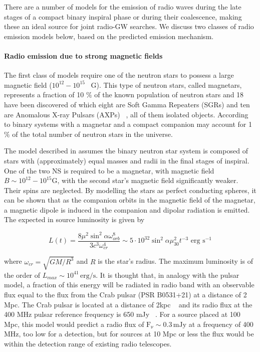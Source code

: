 There are a number of models for the emission of radio
waves during the late stages of a compact binary inspiral phase or during their coalescence,
making these an ideal source for joint radio-GW searches.  We
discuss two classes of radio emission models below, based on the predicted emission mechanism.

\paragraph{Radio emission due to strong magnetic fields}

The first class of models
require one of the neutron stars to possess a large magnetic field
($10^{12} - 10^{15}$ ~G). This type of neutron stars, called magnetars, represents a fraction of 10 $\%$ of the known population of neutron stars \cite{Bogomazov:2009wj} and 18 have been discovered of which eight are Soft Gamma Repeaters (SGRs) and ten are Anomalous X-ray Pulsars (AXPs) ~\cite{magnetar_catalog}, all of them isolated objects. According to \cite{Popov:2005wh} binary systems with a magnetar and a compact companion may account for 1 $\%$ of the total number of neutron stars in the universe. 


The model described in \cite{Lipunov:1996wf} assumes the binary
neutron star system is composed of stars with (approximately) equal
masses and radii in the final stages of inspiral.  One of the two NS
is required to be a magnetar, with magnetic field
$B\sim10^{12}-10^{15} \mathrm{G}$, with the second star's magnetic
field significantly weaker.  Their spins are neglected.  By
modelling the stars as perfect conducting spheres, it can be shown
that as the companion orbits in the magnetic field of the magnetar,
a magnetic dipole is induced in the companion and
dipolar radiation is emitted.  The expected in source luminosity is given by ~\cite{Lipunov:1996wf}

\begin{equation}
\label{lipunovflux}
L(t) = \frac{8\mu^2 \sin^2\alpha \omega_{orb}^8}{3c^3\omega_{cr}^4}
   \sim 5\cdot 10^{32}\sin^2\alpha\mu_{30}^2 t^{-3}\mbox{ erg s}^{-1}
\end{equation}

where $\omega_{cr} = \sqrt{GM/R^3}$ and $R$ is the star's radius.
 The maximum luminosity is of the order
of $L_{max}\sim 10^{41}\,\mathrm{erg/s}$. It is thought that, in
analogy with the pulsar model, a fraction of this energy will be
radiated in radio band with an observable flux equal to the flux from the Crab pulsar (PSR B0531+21) at a distance of 2 Mpc. The Crab pulsar is located at a distance of 2kpc ~\cite{ATNF} and its radio flux at the 400 MHz pulsar reference frequency is 650 mJy ~\cite{Nice:1998dn}. For a source placed at 100 Mpc, this model would predict a radio flux of $\mathrm{F_{\nu}}\sim 0.3\, \mathrm{mJy}$ at a frequency of 400 MHz, too low for a detection, but for sources at 10 Mpc or less the flux would be within the detection range of existing radio telescopes.  



